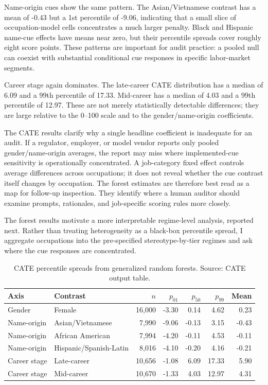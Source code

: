 \documentclass[10pt,twocolumn,letterpaper]{article}
\begin{document}
Name-origin cues show the same pattern. The Asian/Vietnamese contrast has a mean of -0.43 but a 1st percentile of -9.06, indicating that a small slice of occupation-model cells concentrates a much larger penalty. Black and Hispanic name-cue effects have means near zero, but their percentile spreads cover roughly eight score points. These patterns are important for audit practice: a pooled null can coexist with substantial conditional cue responses in specific labor-market segments.

Career stage again dominates. The late-career CATE distribution has a median of 6.09 and a 99th percentile of 17.33. Mid-career has a median of 4.03 and a 99th percentile of 12.97. These are not merely statistically detectable differences; they are large relative to the 0--100 scale and to the gender/name-origin coefficients.

The CATE results clarify why a single headline coefficient is inadequate for an audit. If a regulator, employer, or model vendor reports only pooled gender/name-origin averages, the report may miss where implemented-cue sensitivity is operationally concentrated. A job-category fixed effect controls average differences across occupations; it does not reveal whether the cue contrast itself changes by occupation. The forest estimates are therefore best read as a map for follow-up inspection. They identify where a human auditor should examine prompts, rationales, and job-specific scoring rules more closely.

The forest results motivate a more interpretable regime-level analysis, reported next. Rather than treating heterogeneity as a black-box percentile spread, I aggregate occupations into the pre-specified stereotype-by-tier regimes and ask where the cue responses are concentrated.

\begin{table}[t]
\centering
\caption{CATE percentile spreads from generalized random forests. Source: CATE output table.}
\label{tab:cate}
\begin{tabular}{llrrrrr}
\toprule
Axis & Contrast & $n$ & $p_{01}$ & $p_{50}$ & $p_{99}$ & Mean \\
\midrule
Gender & Female & 16,000 & -3.30 & 0.14 & 4.62 & 0.23 \\
Name-origin & Asian/Vietnamese & 7,990 & -9.06 & -0.13 & 3.15 & -0.43 \\
Name-origin & African American & 7,994 & -4.20 & -0.11 & 4.53 & -0.11 \\
Name-origin & Hispanic/Spanish-Latin & 8,016 & -4.10 & -0.20 & 4.16 & -0.21 \\
Career stage & Late-career & 10,656 & -1.08 & 6.09 & 17.33 & 5.90 \\
Career stage & Mid-career & 10,670 & -1.33 & 4.03 & 12.97 & 4.31 \\
\bottomrule
\end{tabular}
\end{table}
\end{document}
